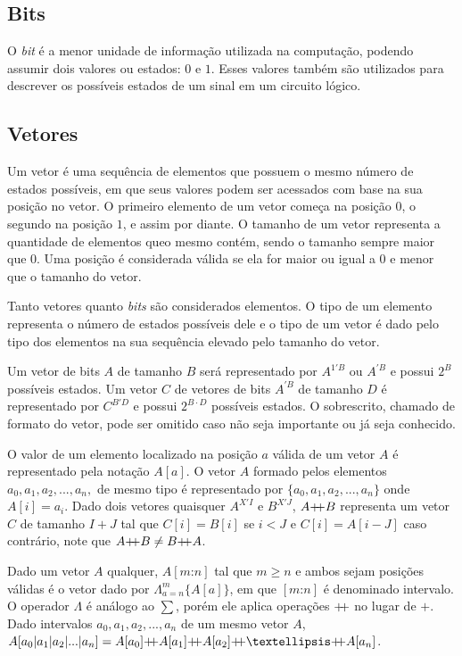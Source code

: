 \subsection{Bits}
\label{sec:bit}

  O \emph{bit} é a menor unidade de informação utilizada na computação, podendo assumir 
  dois valores ou estados: $0$ e $1$. Esses valores também são utilizados para descrever 
  os possíveis estados de um sinal em um circuito lógico.

\subsection{Vetores}
\label{sec:vec}

  Um vetor é uma sequência de elementos que possuem o mesmo número de estados possíveis, 
  em que seus valores podem ser acessados com base na sua posição no vetor. 
  O primeiro elemento de um vetor começa na posição $0$, o segundo na posição $1$,
  e assim por diante. O tamanho de um vetor representa a quantidade de elementos queo mesmo contém,
  sendo o tamanho sempre maior que $0$. Uma posição é considerada válida se ela for maior ou igual a $0$ e 
  menor que o tamanho do vetor.

  Tanto vetores quanto \emph{bits} são considerados elementos. O tipo de um elemento 
  representa o número de estados possíveis dele e o tipo de um vetor é dado pelo tipo 
  dos elementos na sua sequência elevado pelo tamanho do vetor.

  Um vetor de bits $A$ de tamanho $B$ será representado por $A^{1'B}$ ou $A^{'B}$ e 
  possui $2^B$ possíveis estados. Um vetor $C$ de vetores de bits $A^{'B}$ de tamanho
  $D$ é representado por $C^{B'D}$ e possui $2^{B \cdot D}$ possíveis estados. 
  O sobrescrito, chamado de formato do vetor, pode ser omitido caso não seja importante
  ou já seja conhecido.

  O valor de um elemento localizado na posição $a$ válida de um vetor $A$ é representado 
  pela notação $A[a]$. O vetor $A$ formado pelos elementos $a_0, a_1, a_2,..., a_n,$ 
  de mesmo tipo é representado por $\{a_0, a_1, a_2,..., a_n\}$ onde $A[i] = a_i$.
  Dado dois vetores quaisquer $A^{X'I}$ e $B^{X'J}$, $A {+\!\!+} B$ representa um vetor $C$ 
  de tamanho $I + J$ tal que $C[i] = B[i]$ se $i < J$ e $C[i] = A[i-J]$ caso contrário,
  note que $ A {+\!\!+} B \neq B {+\!\!+} A $.

  Dado um vetor $A$ qualquer, $A[m\text{:}n]$ tal que $m \geq n$ e ambos sejam posições
  válidas é o vetor dado por $\Lambda_{a = n}^m{\{A[a]\}}$, em que $[m\text{:}n]$ é denominado 
  intervalo.
  O operador $\Lambda$ é análogo ao $\textstyle \sum$, porém ele aplica operações $ +\!\!+ $ no lugar de $+$.
  Dado intervalos $a_0, a_1, a_2,..., a_n$ de um mesmo vetor $A$, $A[a_0|a_1|a_2|...|a_n] 
  = A[a_0] \mdp A[a_1] \mdp A[a_2] \mdp … \mdp A[a_n]$.

